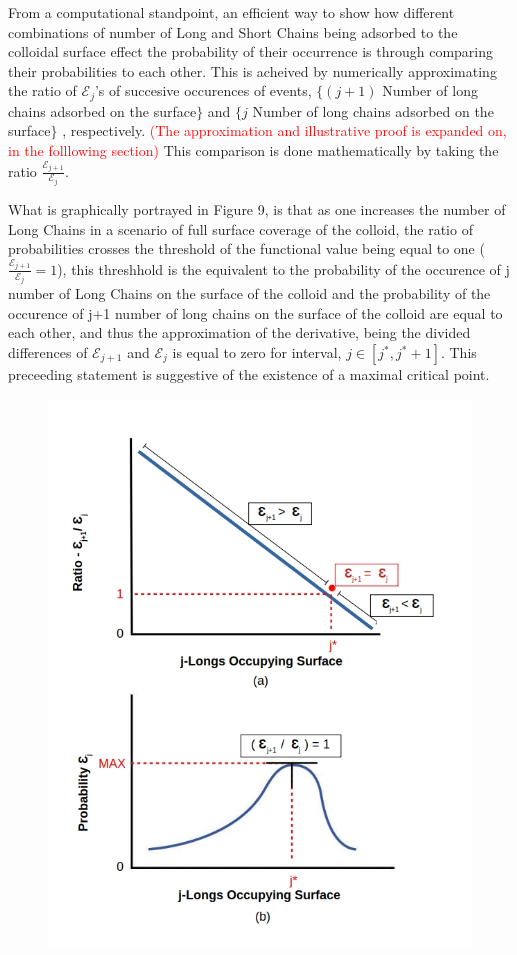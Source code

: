 \documentclass[journal=jacsat,manuscript=article]{achemso}
\begin{document}
From a computational standpoint, an efficient way to show how different combinations of number of Long and Short Chains being adsorbed to the colloidal surface effect the probability of their occurrence is through comparing their probabilities to each other. This is acheived by numerically approximating the ratio of $\mathcal{E}_{j}$'s of succesive occurences of events, $\{ (j+1)$ Number of long chains adsorbed on the surface$\}$ and $\{j$ Number of long chains adsorbed on the surface$\}$ , respectively.
\textcolor{red}{(The approximation and illustrative proof is expanded on, in the folllowing section)} This comparison is done mathematically by taking the ratio $\frac{\mathcal{E}_{j+1}}{\mathcal{E}_{j}}$.

What is graphically portrayed in Figure 9, is that as one increases the number of Long Chains in a scenario of full surface coverage of the colloid, the ratio of probabilities crosses the threshold of the functional value being equal to one ($\frac{\mathcal{E}_{j+1}}{\mathcal{E}_{j}}=1$), this threshhold is the equivalent to the probability of the occurence of j number of Long Chains on the surface of the colloid and the probability of the occurence of j+1 number of long chains on the surface of the colloid are equal to each other, and thus the approximation of the derivative, being the divided differences of $\mathcal{E}_{j+1}$ and $\mathcal{E}_{j}$  is equal to zero for interval,  $j\in[j^*, j^*+1]$. This preceeding statement is suggestive of the existence of a maximal critical point. 

\begin{figure}[H]
\includegraphics[scale=0.50]{fig9ab.jpg}
\caption{}
\label{figure 9}
\end{figure}
\end{document}
